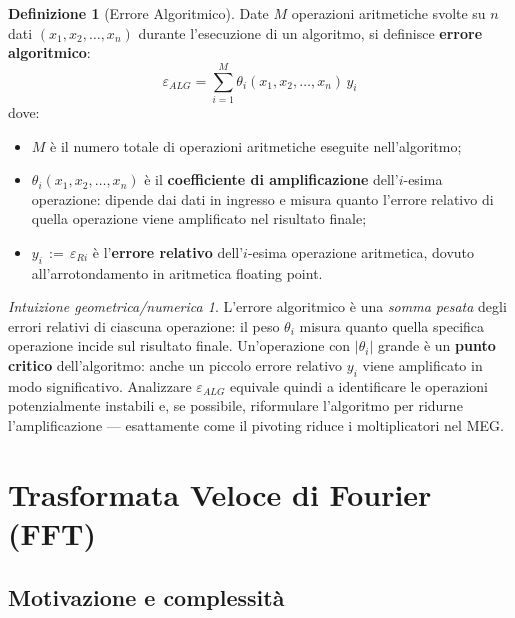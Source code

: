 \documentclass[a4paper,12pt]{article}
\theoremstyle{definition}
\newtheorem{definizione}{Definizione}[section]
\theoremstyle{remark}
\newtheorem*{intuizione}{Intuizione geometrica/numerica}
\begin{document}
\begin{definizione}[Errore Algoritmico]
Date $M$ operazioni aritmetiche svolte su $n$ dati
$(x_1, x_2, \ldots, x_n)$ durante l'esecuzione di un algoritmo,
si definisce \textbf{errore algoritmico}:
\begin{equation}
  \varepsilon_{ALG}
  = \sum_{i=1}^{M} \theta_i(x_1, x_2, \ldots, x_n)\,y_i
  \label{eq:errore-algoritmico}
\end{equation}
dove:
\begin{itemize}
  \item $M$ è il numero totale di operazioni aritmetiche eseguite
        nell'algoritmo;
  \item $\theta_i(x_1, x_2, \ldots, x_n)$ è il \textbf{coefficiente di
        amplificazione} dell'$i$-esima operazione: dipende dai dati in
        ingresso e misura quanto l'errore relativo di quella operazione
        viene amplificato nel risultato finale;
  \item $y_i \,:=\, \varepsilon_{Ri}$ è l'\textbf{errore relativo}
        dell'$i$-esima operazione aritmetica, dovuto all'arrotondamento
        in aritmetica floating point.
\end{itemize}
\end{definizione}

\begin{intuizione}
L'errore algoritmico è una \emph{somma pesata} degli errori relativi di
ciascuna operazione: il peso $\theta_i$ misura quanto quella specifica
operazione incide sul risultato finale. Un'operazione con $|\theta_i|$ grande
è un \textbf{punto critico} dell'algoritmo: anche un piccolo errore relativo
$y_i$ viene amplificato in modo significativo. Analizzare $\varepsilon_{ALG}$
equivale quindi a identificare le operazioni potenzialmente instabili e, se
possibile, riformulare l'algoritmo per ridurne l'amplificazione — esattamente
come il pivoting riduce i moltiplicatori nel MEG.
\end{intuizione}


\section{Trasformata Veloce di Fourier (FFT)}

\subsection{Motivazione e complessità}
\end{document}
